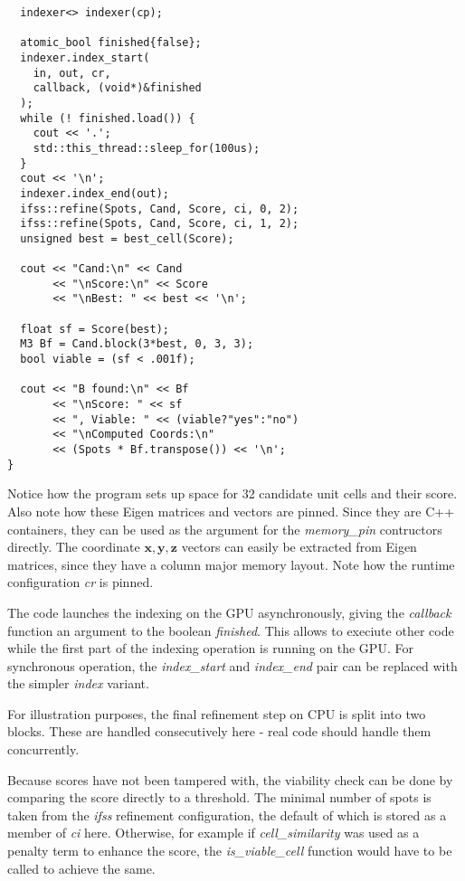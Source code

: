 \documentclass[a4paper,10pt]{article}
\newcommand{\vect}[1]{\mathbf{#1}}
\begin{document}
\begin{lstlisting}
  indexer<> indexer(cp);

  atomic_bool finished{false};
  indexer.index_start(
    in, out, cr,
    callback, (void*)&finished
  );
  while (! finished.load()) {
    cout << '.';
    std::this_thread::sleep_for(100us);
  }
  cout << '\n';
  indexer.index_end(out);
  ifss::refine(Spots, Cand, Score, ci, 0, 2);
  ifss::refine(Spots, Cand, Score, ci, 1, 2);
  unsigned best = best_cell(Score);

  cout << "Cand:\n" << Cand
       << "\nScore:\n" << Score
       << "\nBest: " << best << '\n';

  float sf = Score(best);
  M3 Bf = Cand.block(3*best, 0, 3, 3);
  bool viable = (sf < .001f);

  cout << "B found:\n" << Bf
       << "\nScore: " << sf
       << ", Viable: " << (viable?"yes":"no")
       << "\nComputed Coords:\n"
       << (Spots * Bf.transpose()) << '\n';
}
\end{lstlisting}
%
Notice how the program sets up space for 32 candidate unit cells and their score. Also note how these Eigen matrices and vectors are pinned. Since they are C++ containers, they can be used as the argument for the \emph{memory\_pin} contructors directly. The coordinate $\vect{x},\vect{y},\vect{z}$ vectors can easily be extracted from Eigen matrices, since they have a column major memory layout. Note how the runtime configuration \emph{cr} is pinned.

The code launches the indexing on the GPU asynchronously, giving the \emph{callback} function an argument to the boolean \emph{finished}. This allows to execiute other code while the first part of the indexing operation is running on the GPU. For synchronous operation, the \emph{index\_start} and \emph{index\_end} pair can be replaced with the simpler \emph{index} variant.

For illustration purposes, the final refinement step on CPU is split into two blocks. These are handled consecutively here - real code should handle them concurrently.

Because scores have not been tampered with, the viability check can be done by comparing the score directly to a threshold. The minimal number of spots is taken from the \emph{ifss} refinement configuration, the default of which is stored as a member of \emph{ci} here. Otherwise, for example if \emph{cell\_similarity} was used as a penalty term to enhance the score, the \emph{is\_viable\_cell} function would have to be called to achieve the same.
\end{document}
